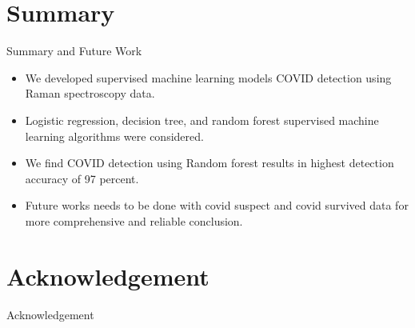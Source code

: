 \section{Summary} %


\begin{frame}{Summary and Future Work}
\linespread{1.3}

\begin{itemize}
    \item We developed supervised machine learning models COVID detection using Raman spectroscopy data.
    \item Logistic regression, decision tree, and random forest supervised machine learning algorithms were considered.
    \item We find COVID detection using Random forest results in highest detection accuracy of 97 percent. 
    \item Future works needs to be done with covid suspect and covid survived data for more comprehensive and reliable conclusion.
    
\end{itemize}


\end{frame}


\section{Acknowledgement} %

\begin{frame}{Acknowledgement}
\linespread{1.3}


\end{frame}







